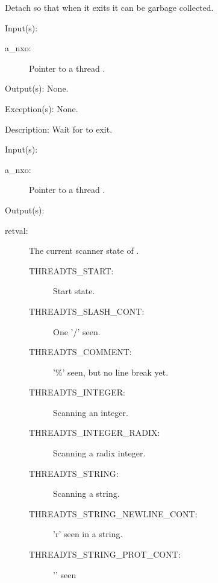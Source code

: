 \begin{capi}
\begin{capilist}
		Detach  so that when it exits it can be garbage
		collected.
	\end{capilist}
\label{nxo_thread_join}
	\begin{capilist}
	\item[Input(s): ]
		\begin{description}\item[]
		\item[a\_nxo: ]
			Pointer to a thread .
		\end{description}
	\item[Output(s): ] None.
	\item[Exception(s): ] None.
	\item[Description: ]
		Wait for  to exit.
	\end{capilist}
\label{nxo_thread_state}
	\begin{capilist}
	\item[Input(s): ]
		\begin{description}\item[]
		\item[a\_nxo: ]
			Pointer to a thread \classname{nxo}.
		\end{description}
	\item[Output(s): ]
		\begin{description}\item[]
		\item[retval: ] The current scanner state of \cvar{a\_nxo}.
			\begin{description}\item[]
			\item[THREADTS\_START: ] Start state.
			\item[THREADTS\_SLASH\_CONT: ] One '/' seen.
			\item[THREADTS\_COMMENT: ] '\%' seen, but no line break
				yet.
			\item[THREADTS\_INTEGER: ] Scanning an integer.
			\item[THREADTS\_INTEGER\_RADIX: ] Scanning a radix
				integer.
			\item[THREADTS\_STRING: ] Scanning a string.
			\item[THREADTS\_STRING\_NEWLINE\_CONT: ] '{\bs}r' seen
				in a string.
			\item[THREADTS\_STRING\_PROT\_CONT: ] '{\bs}{\bs}' seen

\end{description}
\end{description}
\end{capilist}
\end{capi}
